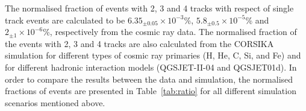 \documentclass[a4paper,12pt,twoside,openany]{article}
\begin{document}
The normalised fraction of events with 2, 3 and 4 tracks with respect of single track events are calculated to be \mbox{$6.35_{\pm0.05}\times 10^{-3}$\%}, \mbox{$5.8_{\pm0.5}\times 10^{-5}$\%} and \mbox{$2_{\pm1}\times 10^{-6}$\%}, respectively from the cosmic ray data. The normalised fraction of the events with 2, 3 and 4 tracks are also calculated from the CORSIKA simulation for different types of cosmic ray primaries (H, He, C, Si, and Fe) and for different hadronic interaction models (QGSJET-II-04 and QGSJET01d). In order to compare the results between the data and simulation, the normalised fractions of events are presented in Table~\ref{tab:ratio} for all different simulation scenarios mentioned above.
\begin{table}[]
  \centering
\end{table}
\end{document}
